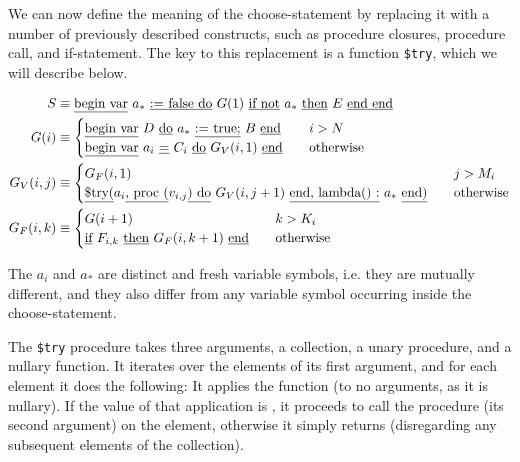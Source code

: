 We can now define the meaning of the choose-statement by replacing it
with a number of previously described constructs, such as procedure
closures, procedure call, and if-statement. The key to this
replacement is a function {\tt \$try}, which we will describe
below.

\begin{align*}
  S & \equiv \text{\underline{begin var}}~a_*~\text{\underline{:= false do}}~G(1)~\text{\underline{if
    not}}~a_*~\text{\underline{then}}~E~\text{\underline{end end}} \\
  G(i) & \equiv 
  \begin{cases}
    \text{\underline{begin var}}~D~\text{\underline{do}}~a_*~\text{\underline{:= true;}}~B~\text{\underline{end}} &\quad i > N\\
    \text{\underline{begin var}}~a_i ~\text{\underline{=}} ~C_i ~\text{\underline{do}}~
    G_V(i, 1) ~\text{\underline{end}} &\quad \text{otherwise} 
  \end{cases}\\
  G_V(i, j) &\equiv
  \begin{cases}
    G_F(i, 1) &\quad j > M_i \\
    \text{\underline{\$try(}}a_i\text{\underline{, proc (}}v_{i, j}\text{\underline{) do}}~G_V(i, j +
    1)~\text{\underline{end, lambda() :}}~a_*~\text{\underline{end)}} &\quad \text{otherwise}
  \end{cases}\\
  G_F(i, k) &\equiv
  \begin{cases}
    G(i+1) &\quad k > K_i\\
    \text{\underline{if}}~F_{i, k}~\text{\underline{then}}~G_F(i, k+1)~\text{\underline{end}} &\quad\text{otherwise}
  \end{cases}
\end{align*}

The $a_i$ and $a_*$ are distinct and fresh variable symbols, i.e. they
are mutually different, and they also differ from any variable symbol
occurring inside the choose-statement.



The {\tt \$try} procedure takes three
arguments, a collection, a unary procedure, and a nullary function. It
iterates over the elements of its first argument, and for each element
it does the following: It applies the function (to no arguments, as it
is nullary). If the value of that application is \kwFalse, it proceeds
to call the procedure (its second argument) on the element, otherwise
it simply returns (disregarding any subsequent elements of the
collection).

